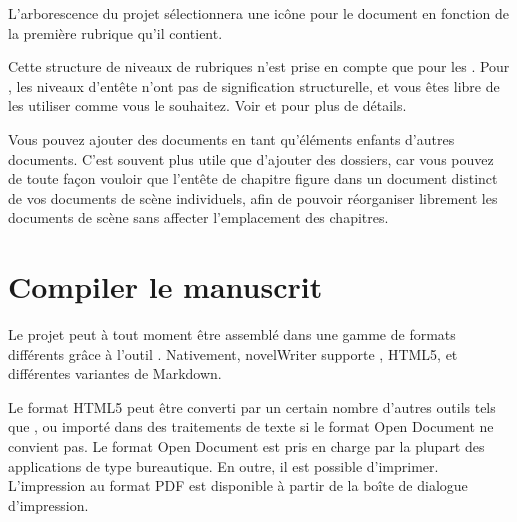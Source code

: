 \documentclass[a4paper,11pt,french]{sphinxmanual}
\begin{document}
\sphinxAtStartPar
L’arborescence du projet sélectionnera une icône pour le document en fonction de la première rubrique qu’il contient.

\sphinxAtStartPar
Cette structure de niveaux de rubriques n’est prise en compte que pour les {\hyperref[\detokenize{int_glossary:term-Novel-Documents}]{}}. Pour {\hyperref[\detokenize{int_glossary:term-Project-Notes}]{}}, les niveaux d’en\sphinxhyphen{}tête n’ont pas de signification structurelle, et vous êtes libre de les utiliser comme vous le souhaitez. Voir {\hyperref[\detokenize{project_structure:a-struct}]{}} et {\hyperref[\detokenize{project_references:a-references}]{}} pour plus de détails.

\sphinxAtStartPar
{}Vous pouvez ajouter des documents en tant qu’éléments enfants d’autres documents. C’est souvent plus utile que d’ajouter des dossiers, car vous pouvez de toute façon vouloir que l’en\sphinxhyphen{}tête de chapitre figure dans un document distinct de vos documents de scène individuels, afin de pouvoir réorganiser librement les documents de scène sans affecter l’emplacement des chapitres.


\section{Compiler le manuscrit}
\label{\detokenize{usage_breakdown:building-a-manuscript}}\label{\detokenize{usage_breakdown:a-breakdown-export}}
\sphinxAtStartPar
Le projet peut à tout moment être assemblé dans une gamme de formats différents grâce à l’outil . Nativement, novelWriter supporte , HTML5, et différentes variantes de Markdown.

\sphinxAtStartPar
Le format HTML5 peut être converti par un certain nombre d’autres outils tels que , ou importé dans des traitements de texte si le format Open Document ne convient pas. Le format Open Document est pris en charge par la plupart des applications de type bureautique. En outre, il est possible d’imprimer. L’impression au format PDF est disponible à partir de la boîte de dialogue d’impression.
\end{document}
